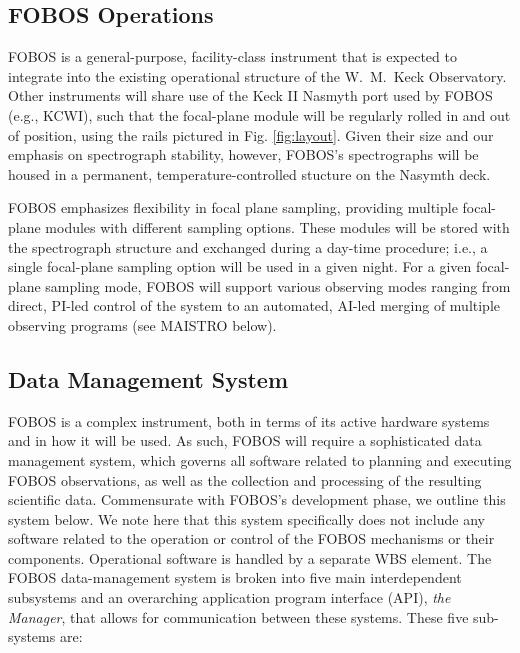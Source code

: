 \documentclass[oneside,11pt]{amsart}
\begin{document}
\subsection{FOBOS Operations}

FOBOS is a general-purpose, facility-class instrument that is
expected to integrate into the existing operational structure of the
W.~M.~Keck Observatory. Other instruments will share use of the Keck
II Nasmyth port used by FOBOS (e.g., KCWI), such that the focal-plane
module will be regularly rolled in and out of position, using the
rails pictured in Fig. \ref{fig:layout}. Given their size and our
emphasis on spectrograph stability, however, FOBOS's spectrographs
will be housed in a permanent, temperature-controlled stucture on the
Nasymth deck.

FOBOS emphasizes flexibility in focal plane sampling, providing
multiple focal-plane modules with different sampling options. These
modules will be stored with the spectrograph structure and exchanged
during a day-time procedure; i.e., a single focal-plane sampling
option will be used in a given night. For a given focal-plane
sampling mode, FOBOS will support various observing modes ranging
from direct, PI-led control of the system to an automated, AI-led
merging of multiple observing programs (see MAISTRO below).



\subsection{Data Management System}

FOBOS is a complex instrument, both in terms of its active hardware
systems and in how it will be used. As such, FOBOS will require a
sophisticated data management system, which governs all software
related to planning and executing FOBOS observations, as well as the
collection and processing of the resulting scientific data.
Commensurate with FOBOS's development phase, we outline this system
below. We note here that this system specifically does not include
any software related to the operation or control of the FOBOS
mechanisms or their components. Operational software is handled by a
separate WBS element. The FOBOS data-management system is broken into
five main interdependent subsystems and an overarching application
program interface (API), {\it the Manager}, that allows for
communication between these systems. These five sub-systems are:
\end{document}
